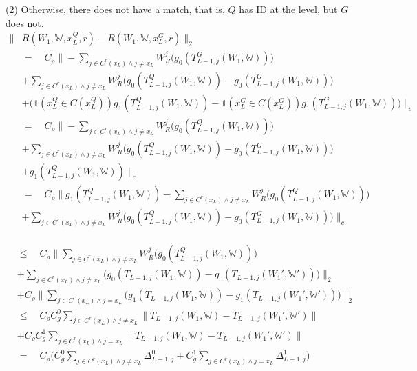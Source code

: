 {{	
}

\stab
(2) Otherwise, there does not have a match,
that is, $Q$ has ID at the level, but $G$ does not.
\begin{equation*}\begin{aligned}
		\|&R(W_1,\mathds{W},x^Q_L,r)-R(W_1,\mathds{W},x^G_L,r)\|_2 \\
		&= \quad C_\rho\bigg\|-\sum_{j\in C^r(x_L)\land j \neq x_L}
		W^j_R\bigg(g_0(T^G_{L-1,j}(W_1,\mathds{W})) \bigg) \\
		&+\sum_{j\in C^r(x_L)\land j \neq x_L}W^j_R\bigg(g_0(T^Q_{L-1,j}(W_1,
		\mathds{W})) -g_0(T^G_{L-1,j}(W_1,\mathds{W}))\bigg) \\
		&+ \bigg(\mathds{1}(x^Q_L\in C(x^Q_L))g_1(T^Q_{L-1,j}(W_1,\mathds{W})) 
		-
		\mathds{1}(x^G_L\in C(x^G_L))g_1(T^G_{L-1,j}(W_1,\mathds{W}))\bigg)
		\bigg\|_c \\
		&=\quad C_\rho\bigg\|-\sum_{j\in C^r(x_L)\land j \neq x_L}
		W^j_R\bigg(g_0(T^Q_{L-1,j}(W_1,\mathds{W})) \bigg) \\
		&+\sum_{j\in C^r(x_L)\land j \neq x_L}W^j_R\bigg(g_0(T^Q_{L-1,j}(W_1,
		\mathds{W})) -
		g_0(T^G_{L-1,j}(W_1,\mathds{W}))\bigg) \\
		&+g_1(T^Q_{L-1,j}(W_1,\mathds{W}))\bigg\|_c \\
		&=\quad C_\rho\bigg\|g_1(T^Q_{L-1,j}(W_1,\mathds{W}))-\sum_{j\in C^r(x_L)\land j 
			\neq x_L}W^j_R\bigg(g_0(T^Q_{L-1,j}(W_1,\mathds{W})) \bigg) \\
		&+\sum_{j\in C^r(x_L)\land j \neq x_L}W^j_R\bigg(g_0(T^Q_{L-1,j}(W_1,\mathds{W})) -
		g_0(T^G_{L-1,j}(W_1,\mathds{W}))\bigg)\bigg\|_c \\
\end{aligned}\end{equation*}


\begin{equation*}\begin{aligned}
		&\leq\quad C_\rho\bigg\|\sum_{j\in C^r(x_L)\land j \neq x_L}
		W^j_R\bigg(g_0(T^Q_{L-1,j}(W_1,
		\mathds{W})) \bigg) \\
		&+\sum_{j\in C^r(x_L)\land j \neq x_L}\bigg(g_0(T_{L-1,j}(W_1,\mathds{W})) -
		g_0(T_{L-1,j}
		(W_1',\mathds{W}'))\bigg)\bigg\|_2 \\
		&+ C_\rho\bigg\|\sum_{j\in C^r(x_L)\land j = x_L}\bigg(g_1(T_{L-1,j}(W_1,
		\mathds{W})) -
		g_1(T_{L-1,j}(W_1',\mathds{W}'))\bigg)\bigg\|_2 \\
		&\leq\quad C_\rho C^0_g\sum_{j\in C^r(x_L)\land j \neq x_L}\bigg\|T_{L-1,j}
		(W_1,
		\mathds{W})-T_{L-1,j}(W_1',\mathds{W}')\bigg\| \\
		&+  C_\rho C^1_g\sum_{j\in C^r(x_L)\land j = x_L}
		\bigg\|T_{L-1,j}(W_1,\mathds{W})-T_{L-1,j}(W_1',\mathds{W}')\bigg\|\\
		&=\quad C_\rho \bigg(C^0_g\sum_{j\in C^r(x_L)\land j\neq x_L}\Delta^0_{L-1,j} 
		+ 
		C^1_g\sum_{j\in C^r(x_L)\land j = x_L}\Delta^1_{L-1,j}\bigg)
\end{aligned}\end{equation*}
}



